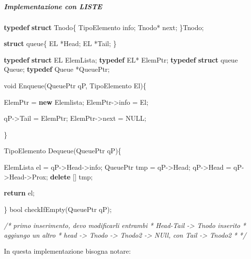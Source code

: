 \documentclass[
]{article}
\newenvironment{Shaded}{}{}
\newcommand{\CommentTok}[1]{\textcolor[rgb]{0.38,0.63,0.69}{\textit{#1}}}
\newcommand{\ControlFlowTok}[1]{\textcolor[rgb]{0.00,0.44,0.13}{\textbf{#1}}}
\newcommand{\DataTypeTok}[1]{\textcolor[rgb]{0.56,0.13,0.00}{#1}}
\newcommand{\KeywordTok}[1]{\textcolor[rgb]{0.00,0.44,0.13}{\textbf{#1}}}
\newcommand{\NormalTok}[1]{#1}
\begin{document}
\hypertarget{header-n1433}{%
\subparagraph{\texorpdfstring{Implementazione con
\emph{LISTE}}{Implementazione con LISTE}}\label{header-n1433}}

\begin{Shaded}
\begin{Highlighting}[]
\KeywordTok{typedef} \KeywordTok{struct}\NormalTok{ Tnodo\{}
\NormalTok{    TipoElemento info;}
\NormalTok{    Tnodo* next;}
\NormalTok{\}Tnodo;}

\KeywordTok{struct}\NormalTok{ queue\{}
\NormalTok{    EL *Head;}
\NormalTok{    EL *Tail;}
\NormalTok{\}}


\KeywordTok{typedef} \KeywordTok{struct}\NormalTok{ EL ElemLista;}
\KeywordTok{typedef}\NormalTok{ EL* ElemPtr;}
\KeywordTok{typedef} \KeywordTok{struct}\NormalTok{ queue Queue;}
\KeywordTok{typedef}\NormalTok{ Queue *QueuePtr;}

\DataTypeTok{void}\NormalTok{ Enqueue(QueuePtr qP, TipoElemento El)\{}
    
\NormalTok{    ElemPtr = }\KeywordTok{new}\NormalTok{ Elemlista;}
\NormalTok{    ElemPtr{-}\textgreater{}info = El;}
    
\NormalTok{    qP{-}\textgreater{}Tail = ElemPtr;}
\NormalTok{    ElemPtr{-}\textgreater{}next = NULL;}
    
\NormalTok{\}}

\NormalTok{TipoElemento Dequeue(QueuePtr qP)\{}
    
\NormalTok{    ElemLista el = qP{-}\textgreater{}Head{-}\textgreater{}info;}
\NormalTok{    QueuePtr tmp = qP{-}\textgreater{}Head;}
\NormalTok{    qP{-}\textgreater{}Head = qP{-}\textgreater{}Head{-}\textgreater{}Prox;}
    \KeywordTok{delete}\NormalTok{ [] tmp;}
    
    \ControlFlowTok{return}\NormalTok{ el;    }
    
\NormalTok{\}}
\DataTypeTok{bool}\NormalTok{ checkIfEmpty(QueuePtr qP);}

\CommentTok{/* primo inserimento, devo modificarli entrambi}
\CommentTok{ * Head{-}Tail {-}\textgreater{} Tnodo inserito}
\CommentTok{ * aggiungo un altro}
\CommentTok{ * head {-}\textgreater{} Tnodo {-}\textgreater{} Tnodo2 {-}\textgreater{} NUll, con Tail {-}\textgreater{} Tnodo2}
\CommentTok{ * }
\CommentTok{ */}
\end{Highlighting}
\end{Shaded}

In questa implementazione bisogna notare:
\end{document}

